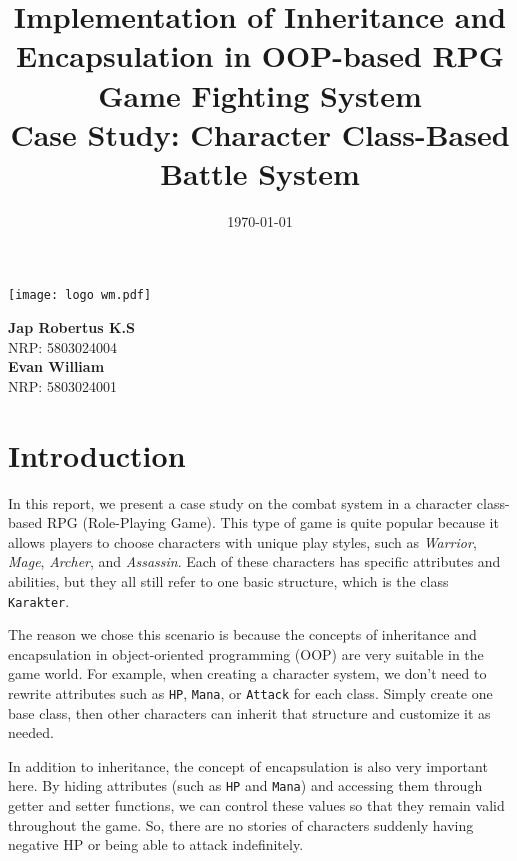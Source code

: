 \documentclass[12pt]{article}
\title{
    \textbf{Implementation of Inheritance and Encapsulation in OOP-based RPG Game Fighting System}\\
    \vspace{1cm}
    \large Case Study: Character Class-Based Battle System
}
\date{\today}
\begin{document}
\maketitle

\begin{center}
    \texttt{[image: logo wm.pdf]}
\end{center}

\vspace{0.5cm}

\begin{center}
    \textbf{Jap Robertus K.S} \\
    NRP: 5803024004 \\[0.5em]
    \textbf{Evan William} \\
    NRP: 5803024001
\end{center}

\newpage
\vspace*{1cm}
\tableofcontents
\newpage

\section{Introduction}

In this report, we present a case study on the combat system in a character class-based RPG (Role-Playing Game). This type of game is quite popular because it allows players to choose characters with unique play styles, such as \textit{Warrior}, \textit{Mage}, \textit{Archer}, and \textit{Assassin}. Each of these characters has specific attributes and abilities, but they all still refer to one basic structure, which is the class \texttt{Karakter}.
\vspace*{0.5cm}

The reason we chose this scenario is because the concepts of inheritance and encapsulation in object-oriented programming (OOP) are very suitable in the game world. For example, when creating a character system, we don't need to rewrite attributes such as \texttt{HP}, \texttt{Mana}, or \texttt{Attack} for each class. Simply create one base class, then other characters can inherit that structure and customize it as needed.
\vspace*{0.5cm}

In addition to inheritance, the concept of encapsulation is also very important here. By hiding attributes (such as \texttt{HP} and \texttt{Mana}) and accessing them through getter and setter functions, we can control these values so that they remain valid throughout the game. So, there are no stories of characters suddenly having negative HP or being able to attack indefinitely.
\vspace*{0.5cm}
\end{document}
